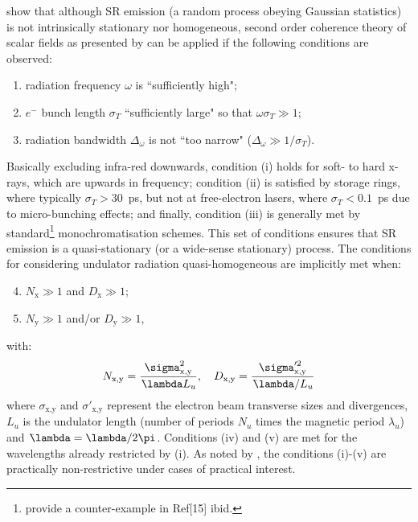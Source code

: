 \documentclass{iucr}              %
\newcommand{\lambdabar}{{\mkern0.75mu\mathchar '26\mkern -8.2mu\lambda}}
\begin{document}
 show that although SR emission (a random process obeying Gaussian statistics) is not intrinsically stationary nor homogeneous, second order coherence theory of scalar fields as presented by  can be applied if the following conditions are observed:
\begin{enumerate}[label=(\roman*)]
\item radiation frequency $\omega$ is ``sufficiently high";
\item $e^-$ bunch length $\sigma_{T}$ ``sufficiently large" so that $\omega\sigma_{T}\gg1$;
\item radiation bandwidth $\Delta_\omega$ is not ``too narrow" ($\Delta_\omega\gg1/\sigma_{T}$).
\end{enumerate}
Basically excluding infra-red downwards, condition (i) holds for soft- to hard x-rays, which are upwards in frequency; condition (ii) is satisfied by storage rings, where typically $\sigma_{T}>30$~ps, but not at free-electron lasers, where $\sigma_{T}<0.1$~ps due to micro-bunching effects; and finally, condition (iii) is generally met by standard\footnote{ provide a counter-example in Ref[15] ibid.} monochromatisation schemes. This set of conditions ensures that SR emission is a quasi-stationary (or a wide-sense stationary) process. The conditions for considering undulator radiation quasi-homogeneous are implicitly met when:
\begin{enumerate}[label=(\roman*)]
\setcounter{enumi}{3}
\item $N_\text{x}\gg1$ and $D_\text{x}\gg1$;
\item $N_\text{y}\gg1$ and/or $D_\text{y}\gg1$,
\end{enumerate}
with:
\begin{equation*}
    N_\text{x,y}=\frac{\sigma^2_\text{x,y}}{\lambdabar L_u}, \quad D_\text{x,y}=\frac{\sigma'^2_\text{x,y}}{\lambdabar/L_u}
\end{equation*}
where $\sigma_\text{x,y}$ and $\sigma'_\text{x,y}$ represent the electron beam transverse sizes and divergences, $L_u$ is the undulator length (number of periods $N_u$ times the magnetic period $\lambda_u$) and $\lambdabar=\lambda/2\pi$. Conditions (iv) and (v) are met for the wavelengths already restricted by (i). As noted by , the conditions (i)-(v) are practically non-restrictive under cases of practical interest.
\end{document}

